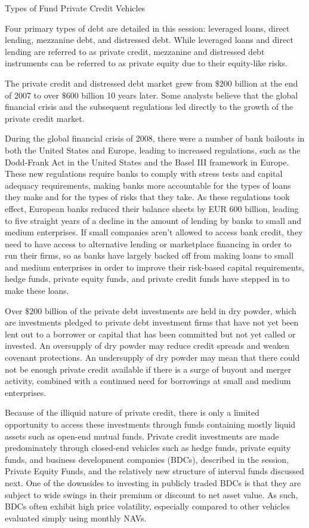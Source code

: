 \documentclass[11pt]{article}
\begin{document}
Types of Fund Private Credit Vehicles

Four primary types of debt are detailed in this session: leveraged loans, direct lending, mezzanine debt, and distressed debt. While leveraged loans and direct lending are referred to as private credit, mezzanine and distressed debt instruments can be referred to as private equity due to their equity-like risks.

The private credit and distressed debt market grew from $\$ 200$ billion at the end of 2007 to over $\$ 600$ billion 10 years later. Some analysts believe that the global financial crisis and the subsequent regulations led directly to the growth of the private credit market.

During the global financial crisis of 2008, there were a number of bank bailouts in both the United States and Europe, leading to increased regulations, such as the Dodd-Frank Act in the United States and the Basel III framework in Europe. These new regulations require banks to comply with stress tests and capital adequacy requirements, making banks more accountable for the types of loans they make and for the types of risks that they take. As these regulations took effect, European banks reduced their balance sheets by EUR 600 billion, leading to five straight years of a decline in the amount of lending by banks to small and medium enterprises. If small companies aren't allowed to access bank credit, they need to have access to alternative lending or marketplace financing in order to run their firms, so as banks have largely backed off from making loans to small and medium enterprises in order to improve their risk-based capital requirements, hedge funds, private equity funds, and private credit funds have stepped in to make these loans.

Over $\$ 200$ billion of the private debt investments are held in dry powder, which are investments pledged to private debt investment firms that have not yet been lent out to a borrower or capital that has been committed but not yet called or invested. An oversupply of dry powder may reduce credit spreads and weaken covenant protections. An undersupply of dry powder may mean that there could not be enough private credit available if there is a surge of buyout and merger activity, combined with a continued need for borrowings at small and medium enterprises.

Because of the illiquid nature of private credit, there is only a limited opportunity to access these investments through funds containing mostly liquid assets such as open-end mutual funds. Private credit investments are made predominately through closed-end vehicles such as hedge funds, private equity funds, and business development companies (BDCs), described in the session, Private Equity Funds, and the relatively new structure of interval funds discussed next. One of the downsides to investing in publicly traded BDCs is that they are subject to wide swings in their premium or discount to net asset value. As such, BDCs often exhibit high price volatility, especially compared to other vehicles evaluated simply using monthly NAVs.
\end{document}
